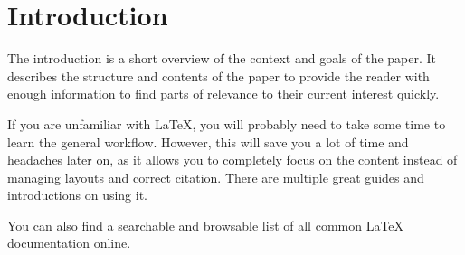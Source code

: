 \chapter{Introduction}

The introduction is a short overview of the context and goals of the paper.
It describes the structure and contents of the paper
to provide the reader with enough information
to find parts of relevance to their current interest quickly.

If you are unfamiliar with {\LaTeX},
you will probably need to take some time to learn the general workflow.
However, this will save you a lot of time and headaches later on,
as it allows you to completely focus on the content
instead of managing layouts and correct citation.
There are multiple great guides and introductions on using it.~\cite{overleaf,learnlatex,wiki}

You can also find a searchable and browsable list of all common {\LaTeX} documentation online.~\cite{texdoc}
